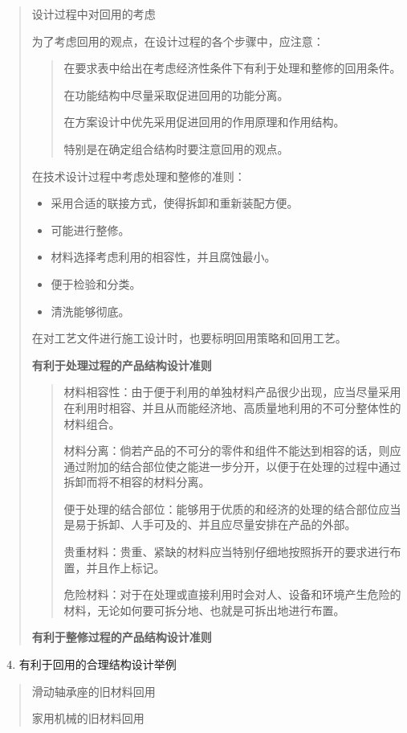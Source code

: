 \documentclass[letterpaper,10pt,english]{sphinxmanual}
\begin{document}
\begin{quote}

设计过程中对回用的考虑

为了考虑回用的观点，在设计过程的各个步骤中，应注意：
\begin{quote}

在要求表中给出在考虑经济性条件下有利于处理和整修的回用条件。

在功能结构中尽量采取促进回用的功能分离。

在方案设计中优先采用促进回用的作用原理和作用结构。

特别是在确定组合结构时要注意回用的观点。
\end{quote}

在技术设计过程中考虑处理和整修的准则：
\begin{itemize}
\item {} 
采用合适的联接方式，使得拆卸和重新装配方便。

\item {} 
可能进行整修。

\item {} 
材料选择考虑利用的相容性，并且腐蚀最小。

\item {} 
便于检验和分类。

\item {} 
清洗能够彻底。

\end{itemize}

在对工艺文件进行施工设计时，也要标明回用策略和回用工艺。

\textbf{有利于处理过程的产品结构设计准则}
\begin{quote}

材料相容性：由于便于利用的单独材料产品很少出现，应当尽量采用在利用时相容、并且从而能经济地、高质量地利用的不可分整体性的材料组合。

材料分离：倘若产品的不可分的零件和组件不能达到相容的话，则应通过附加的结合部位使之能进一步分开，以便于在处理的过程中通过拆卸而将不相容的材料分离。

便于处理的结合部位：能够用于优质的和经济的处理的结合部位应当是易于拆卸、人手可及的、并且应尽量安排在产品的外部。

贵重材料：贵重、紧缺的材料应当特别仔细地按照拆开的要求进行布置，并且作上标记。

危险材料：对于在处理或直接利用时会对人、设备和环境产生危险的材料，无论如何要可拆分地、也就是可拆出地进行布置。
\end{quote}

\textbf{有利于整修过程的产品结构设计准则}
\end{quote}
\begin{enumerate}
\setcounter{enumi}{3}
\item {} 
有利于回用的合理结构设计举例

\end{enumerate}
\begin{quote}

滑动轴承座的旧材料回用

家用机械的旧材料回用
\end{quote}
\end{document}
